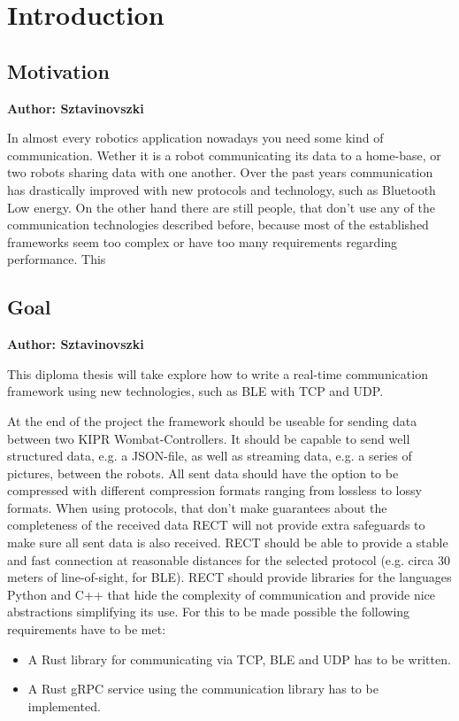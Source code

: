 \chapter{Introduction}


\vspace{2mm}

\section{Motivation}
\textbf{Author: Sztavinovszki}

In almost every robotics application nowadays you need some kind of communication. Wether it is a robot communicating
its data to a home-base, or two robots sharing data with one another. Over the past years communication has drastically
improved with new protocols and technology, such as Bluetooth Low energy. On the other hand there are still people, that
don't use any of the communication technologies described before, because most of the established frameworks seem too
complex or have too many requirements regarding performance. This 

\section{Goal}
\textbf{Author: Sztavinovszki}

This diploma thesis will take explore how to write a real-time communication framework using new technologies, such as BLE with TCP
and UDP.

At the end of the project the framework should be useable for sending data between two KIPR Wombat-Controllers. It should be capable
to send well structured data, e.g. a JSON-file, as well as streaming data, e.g. a series of pictures, between the robots. All sent data should have the
option to be compressed with different compression formats ranging from lossless to lossy formats. When using protocols, that don't make guarantees about
the completeness of the received data RECT will not provide extra safeguards to make sure all sent data is also received.
RECT should be able to provide a stable and fast connection at reasonable distances for the selected protocol (e.g. circa 30 meters of line-of-sight, for BLE).
RECT should provide libraries for the languages Python and C++ that hide the complexity of communication and provide nice abstractions simplifying its use.
For this to be made possible the following requirements have to be met:
\begin{itemize}
\item A Rust library for communicating via TCP, BLE and UDP has to be written.
\item A Rust gRPC service using the communication library has to be implemented.
\end{itemize}

